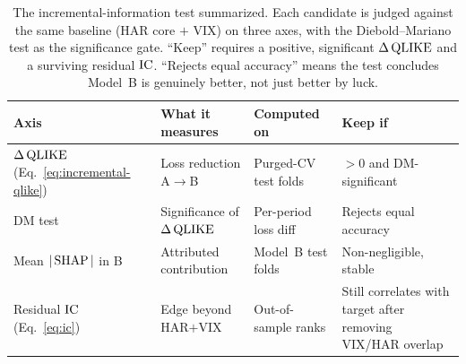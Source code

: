 \begin{table}[ht]
\centering
\caption{The incremental-information test summarized. Each candidate is judged against the same baseline (HAR core $+$ VIX) on three axes, with the Diebold--Mariano test as the significance gate. ``Keep'' requires a positive, significant $\Delta\operatorname{QLIKE}$ and a surviving residual $\operatorname{IC}$. ``Rejects equal accuracy'' means the test concludes Model~B is genuinely better, not just better by luck.}
\label{tab:incremental-test}
\small
\begin{tabular}{@{}llll@{}}
\toprule
\textbf{Axis} & \textbf{What it measures} & \textbf{Computed on} & \textbf{Keep if} \\
\midrule
$\Delta\operatorname{QLIKE}$ (Eq.~\ref{eq:incremental-qlike}) & Loss reduction A$\to$B & Purged-CV test folds & $> 0$ and DM-significant \\
DM test & Significance of $\Delta\operatorname{QLIKE}$ & Per-period loss diff & Rejects equal accuracy \\
Mean $|\operatorname{SHAP}|$ in B & Attributed contribution & Model~B test folds & Non-negligible, stable \\
Residual $\operatorname{IC}$ (Eq.~\ref{eq:ic}) & Edge beyond HAR$+$VIX & Out-of-sample ranks & Still correlates with target after removing VIX/HAR overlap \\
\bottomrule
\end{tabular}
\end{table}

